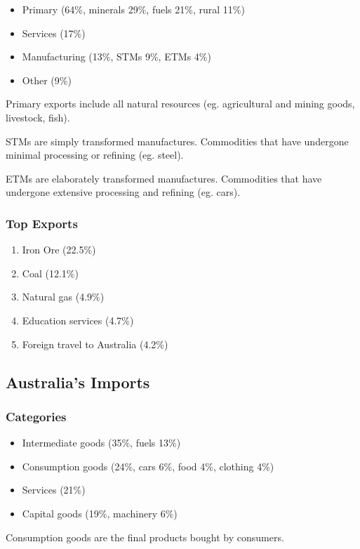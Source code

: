 \documentclass[a4paper,11pt]{report}
\begin{document}
\begin{itemize}
\item Primary (64\%, minerals 29\%, fuels 21\%, rural 11\%)
\item Services (17\%)
\item Manufacturing (13\%, STMs 9\%, ETMs 4\%)
\item Other (9\%)
\end{itemize}

Primary exports include all natural resources (eg. agricultural and mining
goods, livestock, fish).

STMs are simply transformed manufactures. Commodities that have undergone
minimal processing or refining (eg. steel).

ETMs are elaborately transformed manufactures. Commodities that have undergone
extensive processing and refining (eg. cars).

\subsubsection{Top Exports}

\begin{enumerate}
\item Iron Ore (22.5\%)
\item Coal (12.1\%)
\item Natural gas (4.9\%)
\item Education services (4.7\%)
\item Foreign travel to Australia (4.2\%)
\end{enumerate}

\subsection{Australia's Imports}

\subsubsection{Categories}

\begin{itemize}
\item Intermediate goods (35\%, fuels 13\%)
\item Consumption goods (24\%, cars 6\%, food 4\%, clothing 4\%)
\item Services (21\%)
\item Capital goods (19\%, machinery 6\%)
\end{itemize}

Consumption goods are the final products bought by consumers.
\end{document}

